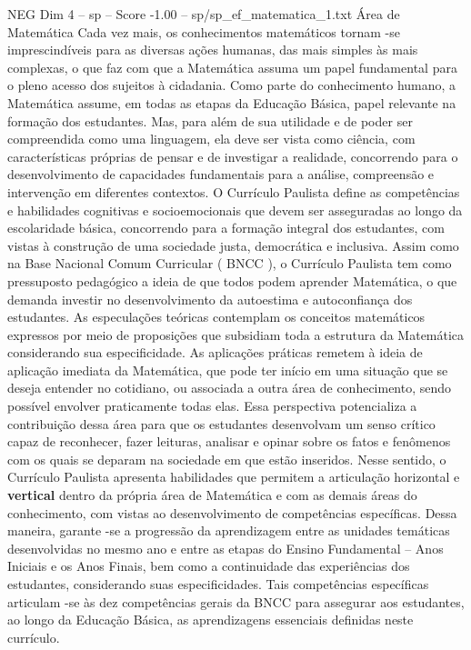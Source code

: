 \begin{textsample}{NEG Dim 4 – sp – Score -1.00 – sp/sp\_ef\_matematica\_1.txt}  \label{ex:f4_neg_040}
Área de Matemática Cada vez mais, os conhecimentos matemáticos tornam -se imprescindíveis para as diversas ações humanas, das mais simples às mais complexas, o que faz com que a Matemática assuma um papel fundamental para o pleno acesso dos sujeitos à cidadania.
Como parte do conhecimento humano, a Matemática assume, em todas as etapas da Educação Básica, papel relevante na formação dos estudantes.
Mas, para além de sua utilidade e de poder ser compreendida como uma linguagem, ela deve ser vista como ciência, com características próprias de pensar e de investigar a realidade, concorrendo para o desenvolvimento de capacidades fundamentais para a análise, compreensão e intervenção em diferentes contextos.
O Currículo Paulista define as competências e habilidades cognitivas e socioemocionais que devem ser asseguradas ao longo da escolaridade básica, concorrendo para a formação integral dos estudantes, com vistas à construção de uma sociedade justa, democrática e inclusiva.
Assim como na Base Nacional Comum Curricular ( BNCC ), o Currículo Paulista tem como pressuposto pedagógico a ideia de que todos podem aprender Matemática, o que demanda investir no desenvolvimento da autoestima e autoconfiança dos estudantes.
As especulações teóricas contemplam os conceitos matemáticos expressos por meio de proposições que subsidiam toda a estrutura da Matemática considerando sua especificidade.
As aplicações práticas remetem à ideia de aplicação imediata da Matemática, que pode ter início em uma situação que se deseja entender no cotidiano, ou associada a outra área de conhecimento, sendo possível envolver praticamente todas elas.
Essa perspectiva potencializa a contribuição dessa área para que os estudantes desenvolvam um senso crítico capaz de reconhecer, fazer leituras, analisar e opinar sobre os fatos e fenômenos com os quais se deparam na sociedade em que estão inseridos.
Nesse sentido, o Currículo Paulista apresenta habilidades que permitem a articulação horizontal e \textbf{vertical} dentro da própria área de Matemática e com as demais áreas do conhecimento, com vistas ao desenvolvimento de competências específicas.
Dessa maneira, garante -se a progressão da aprendizagem entre as unidades temáticas desenvolvidas no mesmo ano e entre as etapas do Ensino Fundamental – Anos Iniciais e os Anos Finais, bem como a continuidade das experiências dos estudantes, considerando suas especificidades.
Tais competências específicas articulam -se às dez competências gerais da BNCC para assegurar aos estudantes, ao longo da Educação Básica, as aprendizagens essenciais definidas neste currículo.

\end{textsample}
